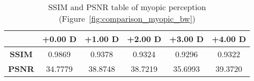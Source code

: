 
\begin{table}[!b]
	\centering
	\label{table:metrics_myopic_bw}
	\caption[SSIM and PSNR table of myopic perception (Figure~\ref{fig:comparison_myopic_bw})]{SSIM and PSNR table of myopic perception (Figure~\ref{fig:comparison_myopic_bw})}

	\begin{tabular}{cccccc}
	{\bf }                          & {\bf +0.00 D} & {\bf +1.00 D} & {\bf +2.00 D} & {\bf +3.00 D} & {\bf +4.00 D} \\ \hline
	\multicolumn{1}{c|}{{\bf SSIM}} & 0.9869  		& 0.9378  		& 0.9324  		& 0.9296  		& 0.9322  		\\
	\multicolumn{1}{c|}{{\bf PSNR}} & 34.7779 		& 38.8748 		& 38.7219 		& 35.6993 		& 39.3720
	\end{tabular}
\end{table}